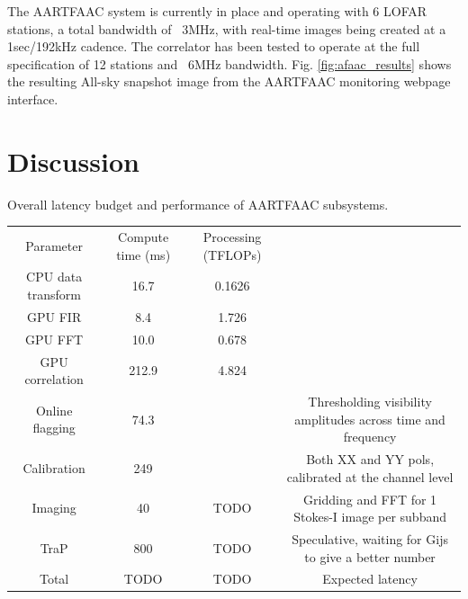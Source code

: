 \documentclass{ws-jai}
\begin{document}
The AARTFAAC system is currently in place and operating with 6 LOFAR stations, a
total bandwidth of  ~3MHz, with real-time images being created  at a 1sec/192kHz
cadence. The correlator has been tested  to operate at the full specification of
12  stations  and  ~6MHz  bandwidth.  Fig.   \ref{fig:afaac_results}  shows  the
resulting All-sky snapshot image from the AARTFAAC monitoring webpage interface.


\section {\label{sec:discussion} Discussion}
\begin{wstable}[h]
\caption{Overall latency budget and performance of AARTFAAC subsystems.}
\begin{tabular}{@{}cccc@{}} \toprule
Parameter & Compute time (ms) & Processing (TFLOPs)\\ \colrule
CPU data transform & 16.7 & 0.1626  \\
GPU FIR & 8.4 & 1.726\\
GPU FFT & 10.0 & 0.678  \\
GPU correlation & 212.9 & 4.824  \\
Online flagging & 74.3 &  & Thresholding visibility amplitudes across time and frequency\\
Calibration & 249 & & Both XX and YY pols, calibrated at the channel level \\
Imaging & 40 & TODO & Gridding and FFT for 1 Stokes-I image per subband \\ 
TraP & 800 & TODO & Speculative, waiting for Gijs to give a better number\\
 \colrule
Total & TODO & TODO & Expected latency
\end{tabular}
\label{tab:afaac_latency}
\end{wstable}
\end{document}
